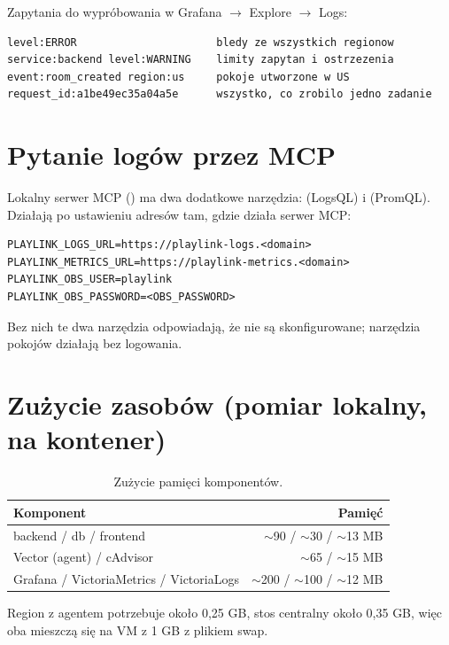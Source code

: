 Zapytania do wypróbowania w Grafana $\rightarrow$ Explore $\rightarrow$ Logs:

\begin{lstlisting}
level:ERROR                      bledy ze wszystkich regionow
service:backend level:WARNING    limity zapytan i ostrzezenia
event:room_created region:us     pokoje utworzone w US
request_id:a1be49ec35a04a5e      wszystko, co zrobilo jedno zadanie
\end{lstlisting}

\section{Pytanie logów przez MCP}

Lokalny serwer MCP () ma dwa dodatkowe narzędzia:
 (LogsQL) i  (PromQL). Działają po ustawieniu
adresów tam, gdzie działa serwer MCP:

\begin{lstlisting}
PLAYLINK_LOGS_URL=https://playlink-logs.<domain>
PLAYLINK_METRICS_URL=https://playlink-metrics.<domain>
PLAYLINK_OBS_USER=playlink
PLAYLINK_OBS_PASSWORD=<OBS_PASSWORD>
\end{lstlisting}

Bez nich te dwa narzędzia odpowiadają, że nie są skonfigurowane; narzędzia pokojów
działają bez logowania.

\section{Zużycie zasobów (pomiar lokalny, na kontener)}

\begin{table}[H]
\centering\small
\begin{tabular}{@{}lr@{}}
\toprule
\textbf{Komponent} & \textbf{Pamięć} \\
\midrule
backend / db / frontend & $\sim$90 / $\sim$30 / $\sim$13 MB \\
Vector (agent) / cAdvisor & $\sim$65 / $\sim$15 MB \\
Grafana / VictoriaMetrics / VictoriaLogs & $\sim$200 / $\sim$100 / $\sim$12 MB \\
\bottomrule
\end{tabular}
\caption{Zużycie pamięci komponentów.}
\end{table}

Region z agentem potrzebuje około 0,25 GB, stos centralny około 0,35 GB, więc oba
mieszczą się na VM z 1 GB z plikiem swap.

